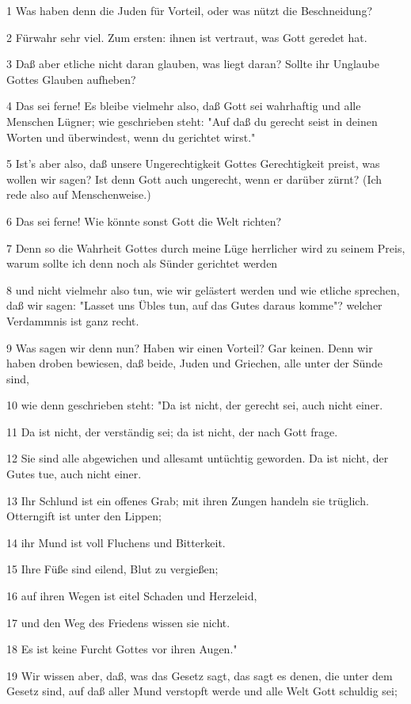 \par 1 Was haben denn die Juden für Vorteil, oder was nützt die Beschneidung?
\par 2 Fürwahr sehr viel. Zum ersten: ihnen ist vertraut, was Gott geredet hat.
\par 3 Daß aber etliche nicht daran glauben, was liegt daran? Sollte ihr Unglaube Gottes Glauben aufheben?
\par 4 Das sei ferne! Es bleibe vielmehr also, daß Gott sei wahrhaftig und alle Menschen Lügner; wie geschrieben steht: "Auf daß du gerecht seist in deinen Worten und überwindest, wenn du gerichtet wirst."
\par 5 Ist's aber also, daß unsere Ungerechtigkeit Gottes Gerechtigkeit preist, was wollen wir sagen? Ist denn Gott auch ungerecht, wenn er darüber zürnt? (Ich rede also auf Menschenweise.)
\par 6 Das sei ferne! Wie könnte sonst Gott die Welt richten?
\par 7 Denn so die Wahrheit Gottes durch meine Lüge herrlicher wird zu seinem Preis, warum sollte ich denn noch als Sünder gerichtet werden
\par 8 und nicht vielmehr also tun, wie wir gelästert werden und wie etliche sprechen, daß wir sagen: "Lasset uns Übles tun, auf das Gutes daraus komme"? welcher Verdammnis ist ganz recht.
\par 9 Was sagen wir denn nun? Haben wir einen Vorteil? Gar keinen. Denn wir haben droben bewiesen, daß beide, Juden und Griechen, alle unter der Sünde sind,
\par 10 wie denn geschrieben steht: "Da ist nicht, der gerecht sei, auch nicht einer.
\par 11 Da ist nicht, der verständig sei; da ist nicht, der nach Gott frage.
\par 12 Sie sind alle abgewichen und allesamt untüchtig geworden. Da ist nicht, der Gutes tue, auch nicht einer.
\par 13 Ihr Schlund ist ein offenes Grab; mit ihren Zungen handeln sie trüglich. Otterngift ist unter den Lippen;
\par 14 ihr Mund ist voll Fluchens und Bitterkeit.
\par 15 Ihre Füße sind eilend, Blut zu vergießen;
\par 16 auf ihren Wegen ist eitel Schaden und Herzeleid,
\par 17 und den Weg des Friedens wissen sie nicht.
\par 18 Es ist keine Furcht Gottes vor ihren Augen."
\par 19 Wir wissen aber, daß, was das Gesetz sagt, das sagt es denen, die unter dem Gesetz sind, auf daß aller Mund verstopft werde und alle Welt Gott schuldig sei;
